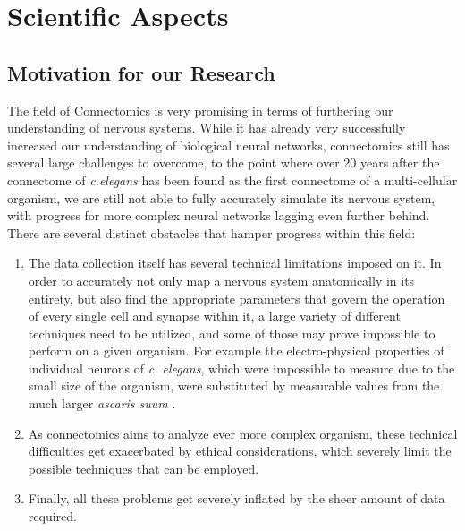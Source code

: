 \documentclass[a4paper,11pt]{article}
\begin{document}
\newpage
%
%
\vspace{\baselineskip}
\vspace*{10mm}
\tableofcontents
\newpage
%
%
\section{Scientific Aspects}
\subsection{Motivation for our Research}

The field of Connectomics is very promising in terms of furthering our understanding of nervous systems. While it has already very successfully increased our understanding of biological neural networks, connectomics still has several large challenges to overcome, to the point where over 20 years after the connectome of \emph{c.elegans} has been found as the first connectome of a multi-cellular organism, we are still not able to fully accurately simulate its nervous system, with progress for more complex neural networks lagging even further behind. There are several distinct obstacles that hamper progress within this field:
\begin{enumerate}
\item The data collection itself has several technical limitations imposed on it. In order to accurately not only map a nervous system anatomically in its entirety, but also find the appropriate parameters that govern the operation of every single cell and synapse within it, a large variety of different techniques need to be utilized, and some of those may prove impossible to perform on a given organism. For example the electro-physical properties of individual neurons of \emph{c. elegans}, which were impossible to measure due to the small size of the organism, were substituted by measurable values from the much larger \emph{ascaris suum} \citep{ThatBlueBook}.
\item As connectomics aims to analyze ever more complex organism, these technical difficulties get exacerbated by ethical considerations, which severely limit the possible techniques that can be employed.
\item Finally, all these problems get severely inflated by the sheer amount of data required.
\end{enumerate}
\end{document}
